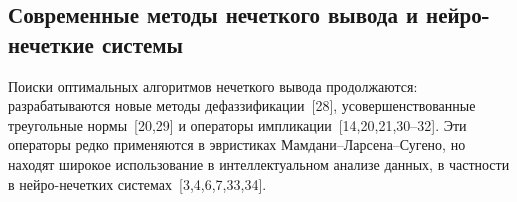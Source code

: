 %
%
%
%
\subsection{Современные методы нечеткого вывода и нейро-нечеткие системы}
\label{sec:advanced_inference}

Поиски оптимальных алгоритмов нечеткого вывода продолжаются: разрабатываются
новые методы дефаззификации~[28], усовершенствованные треугольные нормы~[20,29]
и операторы импликации~[14,20,21,30–32]. Эти операторы редко применяются в
эвристиках Мамдани–Ларсена–Сугено, но находят широкое использование в
интеллектуальном анализе данных, в частности в нейро-нечетких
системах~[3,4,6,7,33,34].

